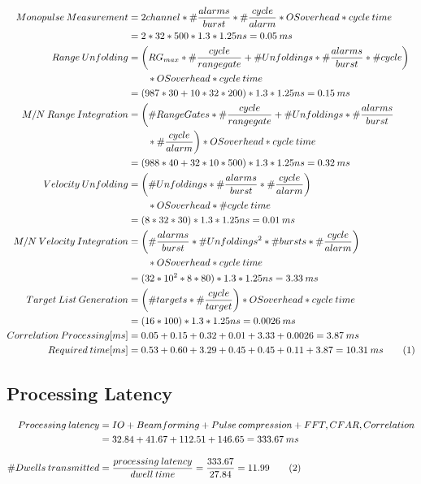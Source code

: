 \begin{align*}
	\label{aa:scheme1:core4:equ3}
		Monopulse \: Measurement &= 2channel * \#\frac{alarms}{burst} * \#\frac{cycle}{alarm} * OSoverhead * cycle \: time \\
		&= 2 * 32 * 500 * 1.3 * 1.25ns = 0.05 \: ms \\
		Range \: Unfolding &= \bigg(RG_{max} * \#\frac{cycle}{rangegate} + \# Unfoldings * \#\frac{alarms}{burst} * \#cycle\bigg) \\
		& \qquad *OSoverhead * cycle \: time \\
		&= (987 * 30 + 10 * 32 * 200) * 1.3 * 1.25ns = 0.15 \: ms \\
		M/N \: Range \: Integration &= \bigg(\#RangeGates * \#\frac{cycle}{rangegate} + \#Unfoldings * \#\frac{alarms}{burst} \\
		&\qquad * \#\frac{cycle}{alarm}\bigg) * OSoverhead *cycle \: time \\
		&= (988 * 40 + 32 * 10 * 500) * 1.3 * 1.25ns = 0.32 \: ms \\
		Velocity \: Unfolding &= \bigg(\#Unfoldings * \#\frac{alarms}{burst} * \#\frac{cycle}{alarm}\bigg) \\
		& \qquad * OSoverhead * \#cycle \: time \\
		&= (8 * 32 * 30) * 1.3 * 1.25ns = 0.01 \: ms \\
		M/N \: Velocity \: Integration &= \bigg(\#\frac{alarms}{burst} * \#Unfoldings^{2} * \#bursts * \#\frac{cycle}{alarm}\bigg) \\
		& \qquad * OSoverhead * cycle \: time \\
		&= (32 * 10^{2} * 8 * 80) * 1.3 * 1.25ns =  3.33 \: ms \\
		Target \: List \: Generation &= \bigg(\#targets * \#\frac{cycle}{target}\bigg) * OSoverhead * cycle \: time \\
		&= (16 * 100) * 1.3 * 1.25ns = 0.0026 \: ms \\
		Correlation \: Processing[ms] &= 0.05 + 0.15 + 0.32 + 0.01 + 3.33 + 0.0026 = 3.87 \: ms \\
		Required \: time[ms] &= 0.53 + 0.60 + 3.29 + 0.45 + 0.45 + 0.11 + 3.87 = 10.31 \: ms \stepcounter{equation}\tag{\theequation}
\end{align*}

\subsection{Processing Latency}
\label{app:sch1:proc_late}
\begin{align*}
	\label{aa:scheme1:latency}
		Processing \: latency &= IO + Beamforming + Pulse \: compression  + FFT,CFAR,Correlation \\
		&= 32.84 + 41.67 + 112.51 + 146.65 = 333.67 \: ms \\[0.3cm]
		\#Dwells \: transmitted &= \frac{processing \: latency}{dwell \: time} = \frac{333.67}{27.84} = 11.99 \stepcounter{equation}\tag{\theequation}
\end{align*}

